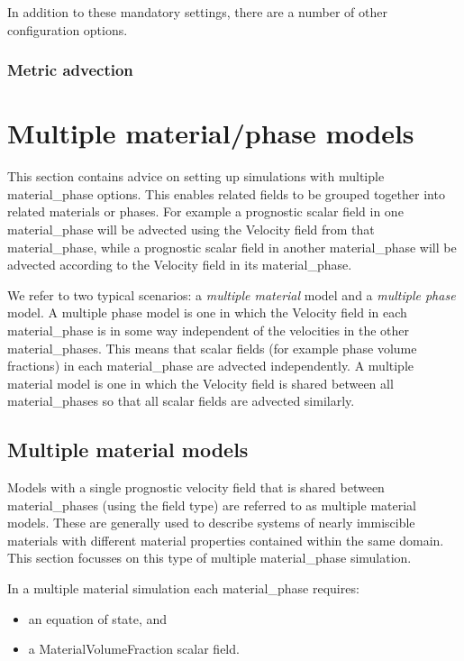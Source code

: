 In addition to these mandatory settings, there are a number of other configuration options.

\subsubsection{Metric advection}
\label{sect:configuring_fluidity_metric_advection}



\section{Multiple material/phase models} \label{sec:config_multimatph}

This section contains advice on setting up simulations with multiple material\_phase options.  This enables related fields to be grouped together into related materials or phases.  For example a prognostic scalar field in one material\_phase will be advected using the Velocity field from that material\_phase, while a prognostic scalar field in another material\_phase will be advected according to the Velocity field in its material\_phase.

We refer to two typical scenarios: a \emph{multiple material} model and a \emph{multiple phase} model. A multiple phase model is one in which the Velocity field in each material\_phase is in some way independent of the velocities in the other material\_phases.  This means that scalar fields (for example phase volume fractions) in each material\_phase are advected independently.  A multiple material model is one in which the Velocity field is shared between all material\_phases so that all scalar fields are advected similarly.

\subsection{Multiple material models}

Models with a single prognostic velocity field that is shared between material\_phases (using the  field type) are referred to as multiple material models.  These are generally used to describe systems of nearly immiscible materials with different material properties contained within the same domain.  This section focusses on this type of multiple material\_phase simulation.

In a multiple material simulation each material\_phase requires:
\begin{itemize}
\item an equation of state, and
\item a MaterialVolumeFraction scalar field.
\end{itemize}

